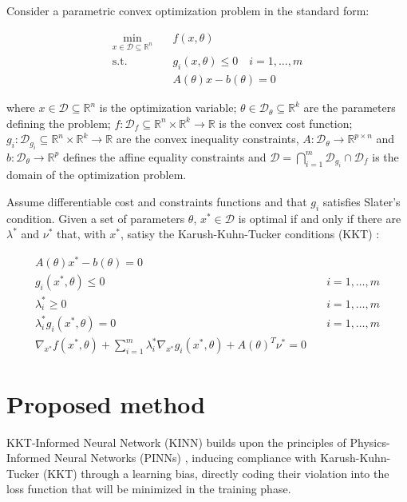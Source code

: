 \documentclass[
]{article}
\begin{document}
Consider a parametric convex optimization problem in the standard form:

\[
\begin{aligned}
\min_{x \in \mathcal{D} \subseteq\mathbb{R}^n} \quad &f(x, {\theta})\\
\textrm{s.t.} \quad & g_i(x, \theta) \leq 0 \quad i = 1, \dots, m \\
& A(\theta) x - b(\theta) = 0
\end{aligned}
\]

where \(x \in \mathcal{D} \subseteq\mathbb{R}^n\) is the optimization
variable; \(\theta \in \mathcal{D}_\theta \subseteq \mathbb{R}^k\) are
the parameters defining the problem;
\(f: \mathcal{D}_f \subseteq\mathbb{R}^n \times \mathbb{R}^k \to \mathbb{R}\)
is the convex cost function;
\(g_i: \mathcal{D}_{g_i} \subseteq\mathbb{R}^n \times \mathbb{R}^k \to \mathbb{R}\)
are the convex inequality constraints,
\(A: \mathcal{D}_\theta \to \mathbb{R}^{p \times n}\) and
\(b: \mathcal{D}_\theta \to \mathbb{R}^{p}\) defines the affine equality
constraints and
\(\mathcal{D} = \bigcap_{i=1}^{m} \mathcal{D}_{g_i} \cap \mathcal{D}_{f}\)
is the domain of the optimization problem.

Assume differentiable cost and constraints functions and that \(g_i\)
satisfies Slater's condition. Given a set of parameters \(\theta\),
\(x^* \in \mathcal{D}\) is optimal if and only if there are
\(\lambda^*\) and \(\nu^*\) that, with \(x^*\), satisy the
Karush-Kuhn-Tucker conditions (KKT) \citep{boydConvexOptimization2004}:

\begin{align}
    A(\theta) x^* - b(\theta) = 0&\\
    g_i(x^*, \theta) \leq 0& \quad i=1,\dots, m\\
    \lambda_i^* \geq 0& \quad i=1,\dots, m\\
    \lambda_i^* g_i(x^*, \theta) = 0& \quad i=1,\dots, m\\
    \nabla_{x^*} f(x^*, \theta) + \sum\nolimits_{i=1}^m \lambda^*_i\nabla_{x^*} g_i(x^*, \theta) + A(\theta)^T\nu^* = 0 &
\end{align}

\section{Proposed method}\label{proposed-method}

KKT-Informed Neural Network (KINN) builds upon the principles of
Physics-Informed Neural Networks (PINNs)
\citep{raissiPhysicsinformedNeuralNetworks2019a}, inducing compliance
with Karush-Kuhn-Tucker (KKT) through a learning bias, directly coding
their violation into the loss function that will be minimized in the
training phase.
\end{document}

